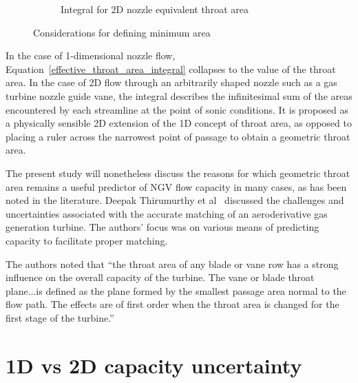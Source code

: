 \documentclass[a4paper, 11pt, twoside]{report}
\begin{document}
\begin{figure}[H]
\begin{subfigure}{.45\textwidth}
		\caption{Integral for 2D nozzle equivalent throat area}
		\label{fig:illustration_of_equivalent_throat_area_integral}
	\end{subfigure}
	\caption{Considerations for defining minimum area}
\end{figure}

In the case of 1-dimensional nozzle flow, Equation~\ref{effective_throat_area_integral} collapses to the value of the throat area. In the case of 2D flow through an arbitrarily shaped nozzle such as a gas turbine nozzle guide vane, the integral describes the infinitesimal sum of the areas encountered by each streamline at the point of sonic conditions. It is proposed as a physically sensible 2D extension of the 1D concept of throat area, as opposed to placing a ruler across the narrowest point of passage to obtain a geometric throat area. 

The present study will nonetheless discuss the reasons for which geometric throat area remains a useful predictor of NGV flow capacity in many cases, as has been noted in the literature. Deepak Thirumurthy et al~\cite{thirumurthy_throat_area} discussed the challenges and uncertainties associated with the accurate matching of an aeroderivative gas generation turbine. The authors' focus was on various means of predicting capacity to facilitate proper matching. 

The authors noted that ``the throat area of any blade or vane row has a strong influence on the overall capacity of the turbine. The vane or blade throat plane...is defined as the plane formed by the smallest passage area normal to the flow path. The effects are of first order when the throat area is changed for the first stage of the turbine.''


\section{1D vs 2D capacity uncertainty}
\label{section_1d_vs_2d_capacity_uncertainty}
\end{document}
